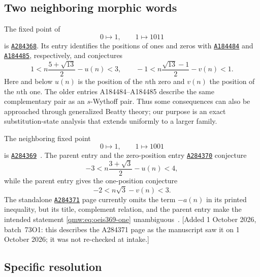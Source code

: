 \documentclass[11pt]{article}
\numberwithin{equation}{section}
\theoremstyle{definition}
\theoremstyle{remark}
\newcommand{\OEIS}[1]{\href{https://oeis.org/#1}{\texttt{#1}}}
\begin{document}
\subsection{Two neighboring morphic words}

The fixed point of
\begin{equation}\label{qmw:eq:sub368}
0\mapsto1,\qquad 1\mapsto1011
\end{equation}
is \OEIS{A284368}.  Its entry identifies the positions of ones and zeros
with \OEIS{A184484} and \OEIS{A184485}, respectively, and conjectures~\cite{oeis368,oeis184484,oeis184485}
\begin{equation}\label{qmw:eq:oeis368}
1<n\frac{5+\sqrt{13}}2-u(n)<3,
\qquad
-1<n\frac{\sqrt{13}-1}{2}-v(n)<1.
\end{equation}
Here and below $u(n)$ is the position of the $n$th zero and $v(n)$ the
position of the $n$th one.  The older entries A184484--A184485 describe the
same complementary pair as an $s$-Wythoff pair.  Thus some consequences can
also be approached through generalized Beatty theory; our purpose is an
exact substitution-state analysis that extends uniformly to a larger family.

The neighboring fixed point
\begin{equation}\label{qmw:eq:sub369}
0\mapsto1,\qquad 1\mapsto1001
\end{equation}
is \OEIS{A284369}~\cite{oeis369}.  The parent entry and the zero-position entry
\OEIS{A284370} conjecture~\cite{oeis370}
\begin{equation}\label{qmw:eq:oeis369-zero}
-3<n\frac{3+\sqrt3}{2}-u(n)<4,
\end{equation}
while the parent entry gives the one-position conjecture
\begin{equation}\label{qmw:eq:oeis369-one}
-2<n\sqrt3-v(n)<3.
\end{equation}
The standalone \OEIS{A284371} page currently omits the term $-a(n)$ in its
printed inequality, but its title, complement relation, and the parent entry
make the intended statement \eqref{qmw:eq:oeis369-one} unambiguous~\cite{oeis371}.
[Added 1 October 2026, batch~73O1: this describes the A284371 page as the
manuscript saw it on 1 October 2026; it was not re-checked at intake.]

\subsection{Specific resolution}
\end{document}
